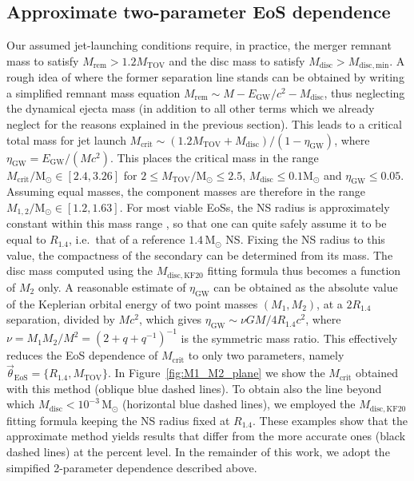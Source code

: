 \documentclass[]{aa}
\newcommand{\resp}[1]{#1}
\begin{document}
\subsection{Approximate two-parameter EoS dependence}
\label{sec:approx_bzconditions} 
Our assumed jet-launching conditions require, in practice, the merger remnant mass to satisfy $M_\mathrm{rem}>1.2 M_\mathrm{TOV}$ and the disc mass to satisfy $M_\mathrm{disc}>M_\mathrm{disc,min}$. A rough idea of where the former separation line stands can be obtained by writing a simplified remnant mass equation $M_\mathrm{rem}\sim M - E_\mathrm{GW}/c^2 - M_\mathrm{disc}$, thus neglecting the dynamical ejecta mass (in addition to all other terms which we already neglect for the reasons explained in the previous section). This leads to a critical total mass for jet launch $M_\mathrm{crit}\sim (1.2 M_\mathrm{TOV}+M_\mathrm{disc})/(1-\eta_\mathrm{GW})$, where $\eta_\mathrm{GW}=E_\mathrm{GW}/(Mc^2)$. This places the critical mass in the range $M_\mathrm{crit}/\mathrm
{M_\odot}\in [2.4,3.26]$ for $2\leq M_\mathrm{TOV}/\mathrm{M_\odot} \leq 2.5$, $M_\mathrm{disc}\leq 0.1 \mathrm{M_\odot}$ and $\eta_\mathrm{GW}\leq 0.05$. Assuming equal masses, the component masses are therefore in the range $M_{1,2}/\mathrm{M_\odot}\in [1.2,1.63]$. For most viable EoSs, the NS radius is approximately  constant within this mass range \citep[e.g.][]{Ozel2016}, so that one can quite safely assume it to be equal to $R_{1.4}$, i.e.~that of a reference $1.4\,\mathrm{M_\odot}$ NS. \resp{Fixing the NS radius to this value, the compactness of the secondary can be determined from its mass. The disc mass computed using the $M_\mathrm{disc,KF20}$ fitting formula thus becomes a function of $M_2$ only.} A reasonable estimate of $\eta_\mathrm{GW}$ can be obtained as the absolute value of the Keplerian orbital energy of two point masses $(M_1, M_2)$, at a $2R_{1.4}$ separation, divided by $M c^2$, which gives $\eta_\mathrm{GW}\sim \nu G M /4 R_{1.4} c^2 $, where $\nu=M_1M_2/M^2=(2+q+q^{-1})^{-1}$ is the symmetric mass ratio. This effectively reduces the EoS dependence of $M_\mathrm{crit}$ to only two parameters, namely $\vec\theta_\mathrm{EoS}=\lbrace R_{1.4},M_\mathrm{TOV}\rbrace$. In Figure~\ref{fig:M1_M2_plane} we show the $M_\mathrm{crit}$ obtained with this method (oblique blue dashed lines). To obtain also the line beyond which $M_\mathrm{disc}<10^{-3}\,\mathrm{M_\odot}$ (horizontal blue dashed lines), we employed the $M_\mathrm{disc,KF20}$ fitting formula keeping the NS radius fixed at $R_{1.4}$. These examples show that the approximate method yields results that differ from the more accurate ones (black dashed lines) at the percent level. \resp{In the remainder of this work, we adopt the simpified 2-parameter dependence described above.}
\end{document}
